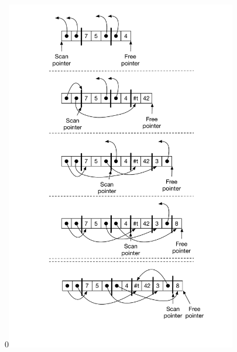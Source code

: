 \documentclass[7x10]{TimesAPriori_MIT}%
\def\racketEd{0}
\def\edition{1}
\newcommand{\racket}[1]{{\if\edition\racketEd{#1}\fi}}
\numberwithin{theorem}{chapter}
\numberwithin{definition}{chapter}
\numberwithin{equation}{chapter}
\begin{document}
\begin{figure}[tbp]
\centering
\begin{tcolorbox}[colback=white]
  \racket{\includegraphics[width=0.9\textwidth]{figs/cheney}}

\end{tcolorbox}
\end{figure}
\end{document}
